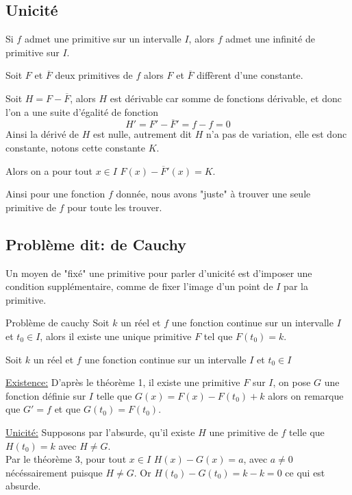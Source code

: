 \documentclass[french]{book}
\begin{document}
\subsection{Unicité}

\begin{thm}
Si $f$ admet une primitive sur un intervalle $I$, alors $f$ admet une infinité de primitive sur $I$.
\end{thm}

\begin{thm}
Soit $F$ et $\overline{F}$ deux primitives de $f$ alors $F$ et  $\overline{F}$  diffèrent d'une constante.
\end{thm}

\begin{demo}
Soit $H=F-\overline{F}$, alors $H$ est dérivable car somme de fonctions dérivable, et donc l'on a une suite d'égalité de fonction
$$H'=F'-\overline{F}'=f-f=0$$  
Ainsi la dérivé de $H$ est nulle, autrement dit $H$ n'a pas de variation, elle est donc constante, notons cette constante $K$.

Alors on a pour tout $x\in I$ $F(x)-\overline{F}'(x)=K$. 
\end{demo}

Ainsi pour une fonction $f$ donnée, nous avons "juste" à trouver une seule primitive de $f$ pour toute les trouver.

\subsection{Problème dit: de Cauchy}
Un moyen de "fixé" une primitive pour parler d'unicité est d'imposer une condition supplémentaire, comme de fixer l'image d'un point de $I$ par la primitive.

\begin{thm}{Problème de cauchy}
Soit $k$ un réel et $f$ une fonction continue sur un intervalle $I$ et $t_0\in I$, alors il existe une unique primitive $F$ tel que $F(t_0)=k$.
\end{thm}


\begin{demo}
Soit $k$ un réel et $f$ une fonction continue sur un intervalle $I$ et $t_0\in I$

\underline{Existence:} 
D'après le théorème 1, il existe une primitive $F$ sur $I$, on pose $G$ une fonction définie sur $I$ telle que $G(x)=F(x)-F(t_0)+k$ alors on remarque que $G'=f$ et que $G(t_0)=F(t_0)$.

 \underline{Unicité:}
Supposons par l'absurde, qu'il existe $H$ une primitive de $f$ telle que $H(t_0)=k$ avec $H\neq G$.\\

Par le théorème 3, pour tout $x \in I$ $H(x)-G(x)=a$, avec $a \neq 0$ nécéssairement puisque $H\neq G$. Or $H(t_0)-G(t_0)=k-k=0$ ce qui est absurde. 
\end{demo}
\newpage
\end{document}
